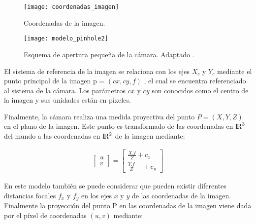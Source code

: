 \begin{figure}[H]
	\centering
	\texttt{[image: coordenadas\_imagen]}
	\caption[Coordenadas de la imágen.]{Coordenadas de la imagen.}
	\label{imagen:coordenadas_imagen}
\end{figure}



\begin{figure}[H]
	\centering
	\texttt{[image: modelo\_pinhole2]}
	\caption[Esquema de apertura pequeña de la cámara]{Esquema de apertura pequeña de la cámara. Adaptado \protect\footnotemark.}
	\label{imagen:modelo_pinhole2}
\end{figure}

El sistema de referencia de la imagen se relaciona con los ejes $X_{c}$ y  $Y_{c}$ mediante el punto principal de la imagen p = $(cx, cy , f)$ , el cual  se encuentra referenciado al sistema de la cámara. Los parámetros $cx$ y $cy$ son conocidos como el centro de la imagen y sus unidades están en píxeles. 


Finalmente, la cámara realiza una medida proyectiva del punto $P = (X, Y, Z)$ en el plano de la imagen. 
Este punto es transformado de las coordenadas en ${\rm I\!R}^3$ del mundo a las coordenadas en ${\rm I\!R}^2$ de la imagen mediante:

\begin{equation}
\begin{matrix} \left[ \begin{matrix} u \\ v \end{matrix} \right] =\left[ \begin{matrix} \frac { X.{ f } }{ Z } +{ c }_{ x } \\ \frac { Y.{ f } }{ Z } \quad +{ c }_{ y } \end{matrix} \right]  \end{matrix}
\label{eq:ProyeccionCAMSimple}
\end{equation}



En este modelo también se puede considerar que pueden existir diferentes distancias focales $f_{x}$ y $f_{y}$  en los ejes $x$ y $y$ de las coordenadas de la imagen.  Finalmente la proyección del punto P en las coordenadas de la imagen viene dada por el píxel de coordenadas $(u, v)$ mediante:


